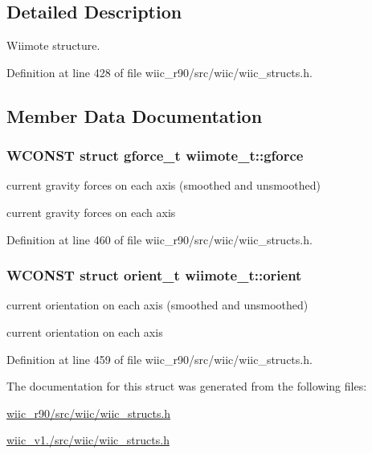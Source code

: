 \subsection{Detailed Description}
Wiimote structure. 

Definition at line 428 of file wiic\-\_\-r90/src/wiic/wiic\-\_\-structs.\-h.



\subsection{Member Data Documentation}
\hypertarget{structwiimote__t_ab2ccaf1bd030bfb24aa60c474b34d1f4}{
\subsubsection[{gforce}]{\setlength{\rightskip}{0pt plus 5cm}W\-C\-O\-N\-S\-T struct {\bf gforce\-\_\-t} wiimote\-\_\-t\-::gforce}}\label{structwiimote__t_ab2ccaf1bd030bfb24aa60c474b34d1f4}


current gravity forces on each axis (smoothed and unsmoothed) 

current gravity forces on each axis 

Definition at line 460 of file wiic\-\_\-r90/src/wiic/wiic\-\_\-structs.\-h.

\hypertarget{structwiimote__t_a793dc495a39c2ae4a4a6cd875094070d}{
\subsubsection[{orient}]{\setlength{\rightskip}{0pt plus 5cm}W\-C\-O\-N\-S\-T struct {\bf orient\-\_\-t} wiimote\-\_\-t\-::orient}}\label{structwiimote__t_a793dc495a39c2ae4a4a6cd875094070d}


current orientation on each axis (smoothed and unsmoothed) 

current orientation on each axis 

Definition at line 459 of file wiic\-\_\-r90/src/wiic/wiic\-\_\-structs.\-h.



The documentation for this struct was generated from the following files\-:\begin{DoxyCompactItemize}
\item 
\hyperlink{wiic__r90_2src_2wiic_2wiic__structs_8h}{wiic\-\_\-r90/src/wiic/wiic\-\_\-structs.\-h}\item 
\hyperlink{wiic__v1_81_2src_2wiic_2wiic__structs_8h}{wiic\-\_\-v1./src/wiic/wiic\-\_\-structs.\-h}\end{DoxyCompactItemize}
